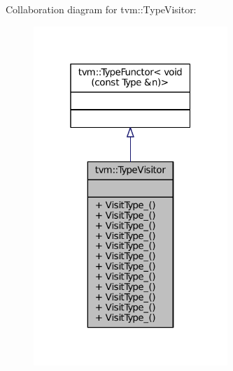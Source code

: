 Collaboration diagram for tvm\+:\+:Type\+Visitor\+:
\nopagebreak
\begin{figure}[H]
\begin{center}
\leavevmode
\includegraphics[width=208pt]{classtvm_1_1TypeVisitor__coll__graph}
\end{center}
\end{figure}
